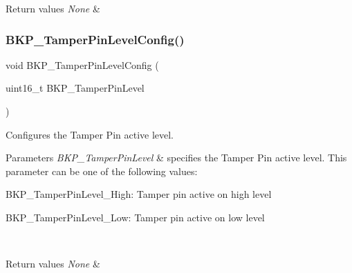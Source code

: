 \begin{DoxyRetVals}{Return values}
{\em None} & \\
\hline
\end{DoxyRetVals}
\mbox{\label{group___b_k_p___exported___functions_gae216446d641d075fb575ce6dbe2ff4c1}} 
\subsubsection{\texorpdfstring{BKP\_TamperPinLevelConfig()}{BKP\_TamperPinLevelConfig()}}
{\footnotesize\ttfamily void B\+K\+P\+\_\+\+Tamper\+Pin\+Level\+Config (\begin{DoxyParamCaption}\item[{uint16\+\_\+t}]{B\+K\+P\+\_\+\+Tamper\+Pin\+Level }\end{DoxyParamCaption})}



Configures the Tamper Pin active level. 


\begin{DoxyParams}{Parameters}
{\em B\+K\+P\+\_\+\+Tamper\+Pin\+Level} & specifies the Tamper Pin active level. This parameter can be one of the following values\+: \begin{DoxyItemize}
\item B\+K\+P\+\_\+\+Tamper\+Pin\+Level\+\_\+\+High\+: Tamper pin active on high level \item B\+K\+P\+\_\+\+Tamper\+Pin\+Level\+\_\+\+Low\+: Tamper pin active on low level \end{DoxyItemize}
\\
\hline
\end{DoxyParams}

\begin{DoxyRetVals}{Return values}
{\em None} & \\
\hline
\end{DoxyRetVals}
\mbox{\label{group___b_k_p___exported___functions_ga18d220387db651b3cb71fad5c092e041}} 
